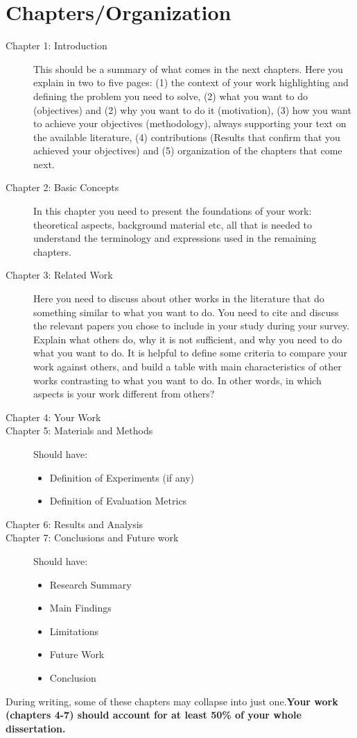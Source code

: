 \section{Chapters/Organization}
\begin{description}
   \item[Chapter 1: Introduction]
This should be a summary of what comes in the next chapters. Here you explain in two to five
pages: (1) the context of your work highlighting and defining the problem you need to solve, (2)
what you want to do (objectives) and (2) why you want to do it (motivation), (3) how you want to
achieve your objectives (methodology), always supporting your text on the available literature, (4)
contributions (Results that confirm that you achieved your objectives) and (5) organization of the
chapters that come next.
\item[Chapter 2: Basic Concepts]
In this chapter you need to present the foundations of your work: theoretical aspects, background
material etc, all that is needed to understand the terminology and expressions used in the remaining
chapters.
\item[Chapter 3: Related Work]
Here you need to discuss about other works in the literature that do something similar to what
you want to do. You need to cite and discuss the relevant papers you chose to include in your study
during your survey. Explain what others do, why it is not sufficient, and why you need to do what
you want to do. It is helpful to define some criteria to compare your work against others, and
build a table with main characteristics of other works contrasting to what you want to do. In other
words, in which aspects is your work different from others?
\item[Chapter 4: Your Work]
\item[Chapter 5: Materials and Methods] Should have:
   \begin{itemize}
      \item Definition of Experiments (if any)
      \item Definition of Evaluation Metrics
   \end{itemize}
\item[Chapter 6: Results and Analysis]
\item[Chapter 7: Conclusions and Future work] Should have:
   \begin{itemize}
      \item Research Summary
      \item Main Findings
      \item Limitations
      \item Future Work
      \item Conclusion
   \end{itemize}
\end{description}
During writing, some of these chapters may collapse into just one.\textbf{Your work (chapters 4-7) should account for at least 50\% of your whole dissertation.}

